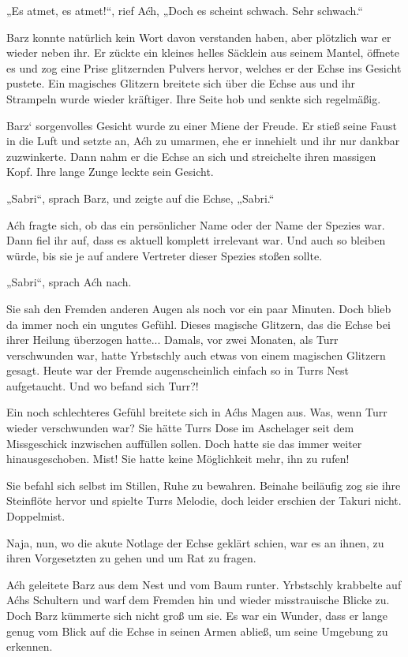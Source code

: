 „Es atmet, es atmet!“, rief Aćh, „Doch es scheint schwach. Sehr schwach.“

Barz konnte natürlich kein Wort davon verstanden haben, aber plötzlich war er wieder neben ihr. Er zückte ein kleines helles Säcklein aus seinem Mantel, öffnete es und zog eine Prise glitzernden Pulvers hervor, welches er der Echse ins Gesicht pustete. Ein magisches Glitzern breitete sich über die Echse aus und ihr Strampeln wurde wieder kräftiger. Ihre Seite hob und senkte sich regelmäßig.

Barz‘ sorgenvolles Gesicht wurde zu einer Miene der Freude. Er stieß seine Faust in die Luft und setzte an, Aćh zu umarmen, ehe er innehielt und ihr nur dankbar zuzwinkerte. Dann nahm er die Echse an sich und streichelte ihren massigen Kopf. Ihre lange Zunge leckte sein Gesicht.

„Sabri“, sprach Barz, und zeigte auf die Echse, „Sabri.“

Aćh fragte sich, ob das ein persönlicher Name oder der Name der Spezies war. Dann fiel ihr auf, dass es aktuell komplett irrelevant war. Und auch so bleiben würde, bis sie je auf andere Vertreter dieser Spezies stoßen sollte.

„Sabri“, sprach Aćh nach.

Sie sah den Fremden anderen Augen als noch vor ein paar Minuten. Doch blieb da immer noch ein ungutes Gefühl. Dieses magische Glitzern, das die Echse bei ihrer Heilung überzogen hatte... Damals, vor zwei Monaten, als Turr verschwunden war, hatte Yrbstschly auch etwas von einem magischen Glitzern gesagt. Heute war der Fremde augenscheinlich einfach so in Turrs Nest aufgetaucht. Und wo befand sich Turr?!

Ein noch schlechteres Gefühl breitete sich in Aćhs Magen aus. Was, wenn Turr wieder verschwunden war? Sie hätte Turrs Dose im Aschelager seit dem Missgeschick inzwischen auffüllen sollen. Doch hatte sie das immer weiter hinausgeschoben. Mist! Sie hatte keine Möglichkeit mehr, ihn zu rufen!

Sie befahl sich selbst im Stillen, Ruhe zu bewahren. Beinahe beiläufig zog sie ihre Steinflöte hervor und spielte Turrs Melodie, doch leider erschien der Takuri nicht. Doppelmist.

Naja, nun, wo die akute Notlage der Echse geklärt schien, war es an ihnen, zu ihren Vorgesetzten zu gehen und um Rat zu fragen.

Aćh geleitete Barz aus dem Nest und vom Baum runter. Yrbstschly krabbelte auf Aćhs Schultern und warf dem Fremden hin und wieder misstrauische Blicke zu. Doch Barz kümmerte sich nicht groß um sie. Es war ein Wunder, dass er lange genug vom Blick auf die Echse in seinen Armen abließ, um seine Umgebung zu erkennen.

